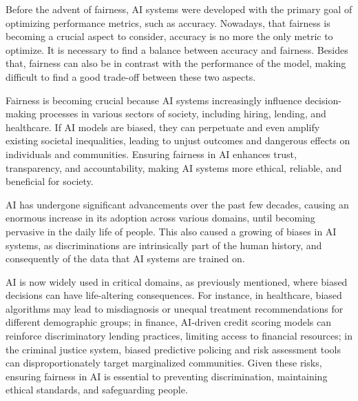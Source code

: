 \documentclass[12pt,a4paper,openright,twoside]{book}
\begin{document}
Before the advent of fairness, \ac{AI} systems were developed with the primary goal of optimizing performance metrics, such as accuracy.
%
Nowadays, that fairness is becoming a crucial aspect to consider, accuracy is no more the only metric to optimize.
%
It is necessary to find a balance between accuracy and fairness.
%
Besides that, fairness can also be in contrast with the performance of the model, making difficult to find a good trade-off between these two aspects.

Fairness is becoming crucial because \ac{AI} systems increasingly influence decision-making processes in various sectors of society, including hiring\missingref, lending\missingref, and healthcare\missingref.
%
If \ac{AI} models are biased, they can perpetuate and even amplify existing societal inequalities, leading to unjust outcomes and dangerous effects on individuals and communities.
\missingref
%
Ensuring fairness in \ac{AI} enhances trust, transparency, and accountability, making \ac{AI} systems more ethical, reliable, and beneficial for society.

\ac{AI} has undergone significant advancements over the past few decades, causing an enormous increase in its adoption across various domains, until becoming pervasive in the daily life of people.
\missingref
%
This also caused a growing of biases in \ac{AI} systems, as discriminations are intrinsically part of the human history, and consequently of the data that \ac{AI} systems are trained on.
\missingref



\ac{AI} is now widely used in critical domains, as previously mentioned, where biased decisions can have life-altering consequences.
\missingref
%
For instance, in healthcare, biased algorithms may lead to misdiagnosis or unequal treatment recommendations for different demographic groups;
%
in finance, \ac{AI}-driven credit scoring models can reinforce discriminatory lending practices, limiting access to financial resources;
\missingref
%
in the criminal justice system, biased predictive policing and risk assessment tools can disproportionately target marginalized communities.
\missingref
%
Given these risks, ensuring fairness in \ac{AI} is essential to preventing discrimination, maintaining ethical standards, and safeguarding people.
\end{document}
